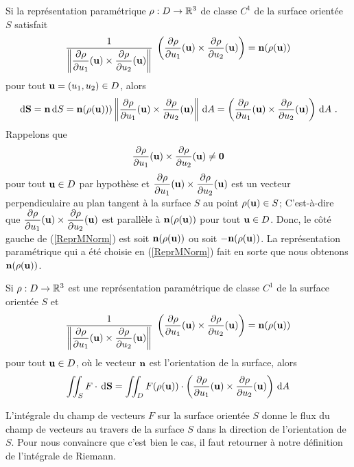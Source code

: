 {Si la représentation paramétrique $\rho:D\rightarrow \mathbb{R}^3$
de classe $C^1$ de la surface orientée $S$ satisfait
\begin{equation}\label{ReprMNorm}
\frac{1}{\displaystyle \left\| \frac{\partial \rho}{\partial u_1}(\mathbf{u}) \times
\frac{\partial \rho}{\partial u_2}(\mathbf{u})\right\|} \;
\left( \frac{\partial \rho}{\partial u_1}(\mathbf{u}) \times \frac{\partial \rho}{\partial u_2}(\mathbf{u}) \right)
= \mathbf{n}(\rho(\mathbf{u}))
\end{equation}
pour tout $\mathbf{u} = (u_1,u_2) \in D$, alors
\[
\,\mathrm{d}\mathbf{S} = \mathbf{n} \,\mathrm{d}S 
= \mathbf{n}(\rho(\mathbf{u}))) 
\left\| \frac{\partial \rho}{\partial u_1}(\mathbf{u}) \times
\frac{\partial \rho}{\partial u_2}(\mathbf{u})\right\| \,\mathrm{d}A
= \left( \frac{\partial \rho}{\partial u_1}(\mathbf{u}) \times
\frac{\partial \rho}{\partial u_2}(\mathbf{u})\right) \,\mathrm{d}A \ .
\]
Rappelons que
\[
\frac{\partial \rho}{\partial u_1}(\mathbf{u}) \times \frac{\partial \rho}{\partial u_2}(\mathbf{u}) \neq \mathbf{0}
\]
pour tout $\mathbf{u} \in D$ par hypothèse et
$\displaystyle \frac{\partial \rho}{\partial u_1}(\mathbf{u}) \times \frac{\partial \rho}{\partial u_2}(\mathbf{u})$
est un vecteur perpendiculaire au plan tangent à la surface
$S$ au point $\rho(\mathbf{u}) \in S$;
C'est-à-dire que 
$\displaystyle \frac{\partial \rho}{\partial u_1}(\mathbf{u}) \times \frac{\partial \rho}{\partial u_2}(\mathbf{u})$
est parallèle à $\mathbf{n}(\rho(\mathbf{u}))$ pour tout
$\mathbf{u} \in D$.  Donc, le côté gauche de (\ref{ReprMNorm}) est soit
$\mathbf{n}(\rho(\mathbf{u}))$ ou soit $-\mathbf{n}(\rho(\mathbf{u}))$.
La représentation paramétrique qui a été choisie en (\ref{ReprMNorm})
fait en sorte que nous obtenons $\mathbf{n}(\rho(\mathbf{u}))$.

\begin{prop}
Si $\rho:D\rightarrow \mathbb{R}^3$ est une représentation paramétrique de classe
$C^1$ de la surface orientée $S$ et
\[
\frac{1}{\displaystyle \left\| \frac{\partial \rho}{\partial u_1}(\mathbf{u}) \times
\frac{\partial \rho}{\partial u_2}(\mathbf{u})\right\|} \;
\left( \frac{\partial \rho}{\partial u_1}(\mathbf{u}) \times \frac{\partial \rho}{\partial u_2}(\mathbf{u}) \right)
= \mathbf{n}(\rho(\mathbf{u}))
\]
pour tout $\mathbf{u} \in D$, où le vecteur $\mathbf{n}$ est l'orientation de
la surface, alors
\begin{equation} \label{formula}
\iint_S F \cdot \,\mathrm{d}\mathbf{S}
= \iint_D F(\rho(\mathbf{u})) \cdot \left(\frac{\partial \rho}{\partial u_1}(\mathbf{u})
\times \frac{\partial \rho}{\partial u_2}(\mathbf{u})\right) \,\mathrm{d}A
\end{equation}
\end{prop}

\begin{rmk}
L'intégrale du champ de vecteurs $F$ sur la surface orientée $S$
donne le flux du champ de vecteurs au travers de la surface $S$ dans
la direction de l'orientation de $S$.  Pour nous convaincre que c'est
bien le cas, il faut retourner à notre définition de l'intégrale de
Riemann.


\end{rmk}}
